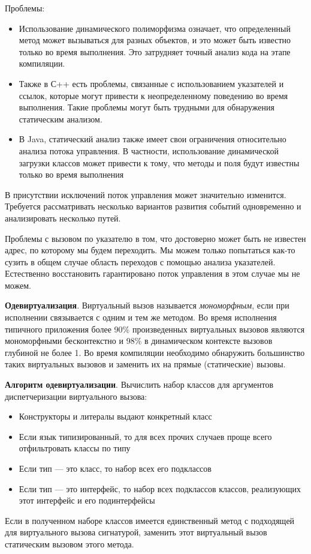 
Проблемы:
\begin{itemize}
    \item Использование динамического полиморфизма означает, что определенный метод может вызываться для разных объектов, и это может быть известно только во время выполнения. Это затрудняет точный анализ кода на этапе компиляции.
    
    \item Также в С++ есть проблемы, связанные с использованием указателей и ссылок, которые могут привести к неопределенному поведению во время выполнения. Такие проблемы могут быть трудными для обнаружения статическим анализом.
    \item В Java, статический анализ также имеет свои ограничения относительно анализа потока управления. В частности, использование динамической загрузки классов может привести к тому, что методы и поля будут известны только во время выполнения
\end{itemize}

В присутствии исключений поток управления может значительно изменится. Требуется рассматривать несколько вариантов развития событий одновременно и анализировать несколько путей.

Проблемы с вызовом по указателю в том, что достоверно может быть не известен адрес, по которому мы будем переходить. Мы можем только попытаться как-то сузить в общем случае область переходов с помощью анализа указателей. Естественно восстановить гарантировано поток управления в этом случае мы не можем.

\textbf{Одевиртуализация}. Виртуальный вызов называется \textit{мономорфным}, если при исполнении связывается с одним и тем же методом. Во время исполнения типичного приложения более 90\% произведенных виртуальных вызовов являются мономорфными бесконтекстно и 98\% в динамическом контексте вызовов глубиной не более 1. Во время компиляции необходимо обнаружить большинство таких виртуальных вызовов и заменить их на прямые (статические) вызовы.

\textbf{Алгоритм одевиртуализации}. Вычислить набор классов для аргументов диспетчеризации виртуального вызова:
\begin{itemize}
    \item Конструкторы и литералы выдают конкретный класс
    \item Если язык типизированный, то для всех прочих случаев проще всего отфильтровать классы по типу
    \item Если тип — это класс, то набор всех его подклассов
    \item  Если тип — это интерфейс, то набор всех подклассов классов,
реализующих этот интерфейс и его подинтерфейсы
\end{itemize}

Если в полученном наборе классов имеется единственный метод с подходящей для виртуального вызова сигнатурой, заменить этот виртуальный вызов статическим вызовом этого метода.
